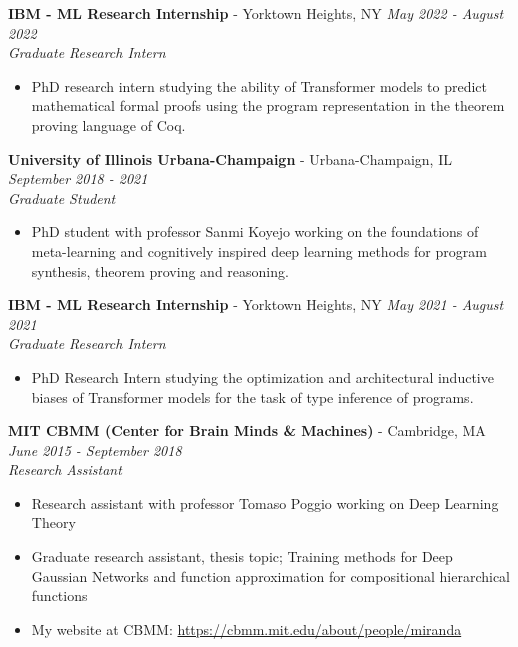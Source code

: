 \documentclass{article}
\newenvironment{changemargin}[2]{%
  \begin{list}{}{%
    \setlength{\topsep}{0pt}%
    \setlength{\leftmargin}{#1}%
    \setlength{\rightmargin}{#2}%
    \setlength{\listparindent}{\parindent}%
    \setlength{\itemindent}{\parindent}%
    \setlength{\parsep}{\parskip}%
  }%
  \item[]}{\end{list}
}
\newenvironment{body} {
	\vspace*{-16pt}
	\begin{changemargin}{-0.25in}{-0.5in}
  }	
	{\end{changemargin}
}
\begin{document}
\begin{body}
	\textbf{IBM - ML Research Internship} - Yorktown Heights, NY \hfill \emph{May 2022 - August 2022}\\
	\emph{Graduate Research Intern}\\
	\vspace*{-3pt}
	\begin{itemize} \itemsep -2pt  %
		\item PhD research intern studying the ability of Transformer models to predict mathematical formal proofs using the program representation in the theorem proving language of Coq.
	\end{itemize}

	\textbf{University of Illinois Urbana-Champaign} - Urbana-Champaign, IL \hfill \emph{September 2018 - 2021}\\
	\emph{Graduate Student}\\
	\vspace*{-3pt}
	\begin{itemize} \itemsep -2pt  %
		\item PhD student with professor Sanmi Koyejo working on the foundations of meta-learning and cognitively inspired deep learning methods for program synthesis, theorem proving and reasoning.
	\end{itemize}
	\vspace{5 pt}
	
	\textbf{IBM - ML Research Internship} - Yorktown Heights, NY \hfill \emph{May 2021 - August 2021}\\
	\emph{Graduate Research Intern}\\
	\vspace*{-3pt}
	\begin{itemize} \itemsep -2pt  %
		\item PhD Research Intern studying the optimization and architectural inductive biases of Transformer models for the task of type inference of programs. 
	\end{itemize}
	\vspace{5 pt}

	\textbf{MIT CBMM (Center for Brain Minds \& Machines)} - Cambridge, MA \hfill \emph{June 2015 - September 2018}\\
	\emph{Research Assistant}\\
	\vspace*{-3pt}
	\begin{itemize} \itemsep -2pt  %
        \item Research assistant with professor Tomaso Poggio working on Deep Learning Theory
        \item Graduate research assistant, thesis topic; Training methods for Deep Gaussian Networks and function approximation for compositional hierarchical functions
        \item My website at CBMM: \href{https://cbmm.mit.edu/about/people/miranda}{https://cbmm.mit.edu/about/people/miranda}
	\end{itemize}
	\vspace{5 pt}
    

\end{body}
\end{document}
